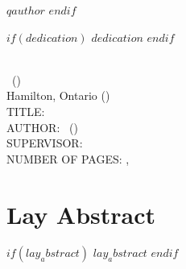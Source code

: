 \documentclass[
11pt, %
oneside, %
english, %
singlespacing, %
]{macthesis} %
\def\blankpage{%
      \clearpage%
      \thispagestyle{empty}%
      \addtocounter{page}{-1}%
      \null%
      \clearpage}
\begin{document}
\hfill\textemdash $qauthor$
$endif$

\blankpage
\clearpage



$if(dedication)$
    $dedication$
$endif$

\blankpage
\clearpage


\newpage
{} %
\setcounter{page}{2} %

\noindent %
\univname \\
\degreename\, (\the\year) \\
Hamilton, Ontario (\deptname) \\[1.5cm]
TITLE: \ttitle \\
AUTHOR: \authorname\,  %
(\univname)  \\
SUPERVISOR: \supname\, \\
NUMBER OF PAGES: \pageref{lastoffront}, \pageref{LastPage}  %

\clearpage

\section*{Lay Abstract}
$if(lay_abstract)$
  $lay_abstract$
$endif$
\blankpage
\clearpage
\end{document}
